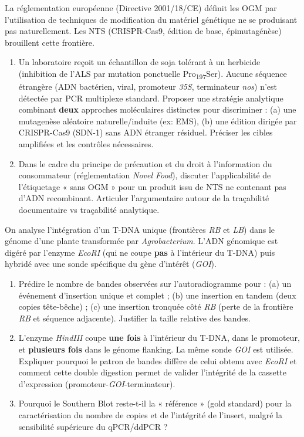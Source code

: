 \documentclass[11pt]{article}
\begin{document}
\begin{exercice}
La réglementation européenne (Directive 2001/18/CE) définit les OGM par l'utilisation de techniques de modification du matériel génétique ne se produisant pas naturellement. Les NTS (CRISPR-Cas9, édition de base, épimutagénèse) brouillent cette frontière.
\begin{enumerate}
    \item Un laboratoire reçoit un échantillon de soja tolérant à un herbicide (inhibition de l'ALS par mutation ponctuelle Pro\textsubscript{197}Ser). Aucune séquence étrangère (ADN bactérien, viral, promoteur \textit{35S}, terminateur \textit{nos}) n'est détectée par PCR multiplexe standard. Proposer une stratégie analytique combinant \textbf{deux} approches moléculaires distinctes pour discriminer : (a) une mutagenèse aléatoire naturelle/induite (ex: EMS), (b) une édition dirigée par CRISPR-Cas9 (SDN-1) sans ADN étranger résiduel. Préciser les cibles amplifiées et les contrôles nécessaires.
    \item Dans le cadre du principe de précaution et du droit à l'information du consommateur (réglementation \textit{Novel Food}), discuter l'applicabilité de l'étiquetage « sans OGM » pour un produit issu de NTS ne contenant pas d'ADN recombinant. Articuler l'argumentaire autour de la traçabilité documentaire vs traçabilité analytique.
\end{enumerate}
\end{exercice}

\begin{exercice}
On analyse l'intégration d'un T-DNA unique (frontières \textit{RB} et \textit{LB}) dans le génome d'une plante transformée par \textit{Agrobacterium}. L'ADN génomique est digéré par l'enzyme \textit{EcoRI} (qui ne coupe \textbf{pas} à l'intérieur du T-DNA) puis hybridé avec une sonde spécifique du gène d'intérêt (\textit{GOI}).
\begin{enumerate}
    \item Prédire le nombre de bandes observées sur l'autoradiogramme pour : (a) un événement d'insertion unique et complet ; (b) une insertion en tandem (deux copies tête-bêche) ; (c) une insertion tronquée côté \textit{RB} (perte de la frontière \textit{RB} et séquence adjacente). Justifier la taille relative des bandes.
    \item L'enzyme \textit{HindIII} coupe \textbf{une fois} à l'intérieur du T-DNA, dans le promoteur, et \textbf{plusieurs fois} dans le génome flanking. La même sonde \textit{GOI} est utilisée. Expliquer pourquoi le patron de bandes diffère de celui obtenu avec \textit{EcoRI} et comment cette double digestion permet de valider l'intégrité de la cassette d'expression (promoteur-\textit{GOI}-terminateur).
    \item Pourquoi le Southern Blot reste-t-il la « référence » (gold standard) pour la caractérisation du nombre de copies et de l'intégrité de l'insert, malgré la sensibilité supérieure du qPCR/ddPCR ?
\end{enumerate}
\end{exercice}
\end{document}
